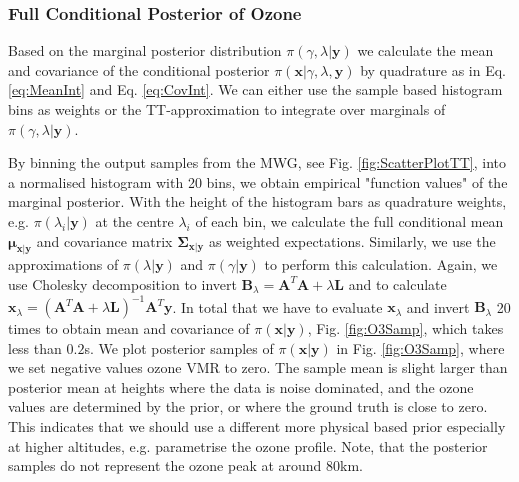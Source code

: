 \subsubsection{Full Conditional Posterior of Ozone}
\label{subsec:firstCond}
Based on the marginal posterior distribution $\pi(\gamma, \lambda | \bm{y})$ we calculate the mean and covariance of the conditional posterior $\pi(\bm{x} | \gamma, \lambda, \bm{y})$ by quadrature as in Eq. \ref{eq:MeanInt} and Eq. \ref{eq:CovInt}.
We can either use the sample based histogram bins as weights or the TT-approximation to integrate over marginals of $\pi(\gamma, \lambda | \bm{y})$.

By binning the output samples from the MWG, see Fig. \ref{fig:ScatterPlotTT}, into a normalised histogram with 20 bins, we obtain empirical "function values" of the marginal posterior.
With the height of the histogram bars as quadrature weights, e.g. $\pi(\lambda_i| \bm{y})$ at the centre $\lambda_i$ of each bin, we calculate the full conditional mean $\bm{\mu}_{\bm{x}|\bm{y}}$ and covariance matrix $\bm{\Sigma}_{\bm{x}|\bm{y}}$ as weighted expectations.
Similarly, we use the approximations of $\pi(\lambda| \bm{y})$ and $\pi( \gamma | \bm{y})$ to perform this calculation.
Again, we use Cholesky decomposition to invert $\bm{B}_{\lambda} = \bm{A}^T \bm{A} + \lambda \bm{L}$ and to calculate $\bm{x}_{\lambda} = (\bm{A}^T \bm{A} + \lambda \bm{L} )^{-1} \bm{A}^T \bm{y}$.
In total that we have to evaluate $\bm{x}_{\lambda}$ and invert $\bm{B}_{\lambda}$ 20 times to obtain mean and covariance of $\pi(\bm{x}|\bm{y})$, Fig. \ref{fig:O3Samp}, which takes less than $0.2$s.
We plot posterior samples of $\pi(\bm{x}|\bm{y})$ in Fig. \ref{fig:O3Samp}, where we set negative values ozone VMR to zero.
The sample mean is slight larger than posterior mean at heights where the data is noise dominated, and the ozone values are determined by the prior, or where the ground truth is close to zero.
This indicates that we should use a different more physical based prior especially at higher altitudes, e.g. parametrise the ozone profile.
Note, that the posterior samples do not represent the ozone peak at around $80$km.
